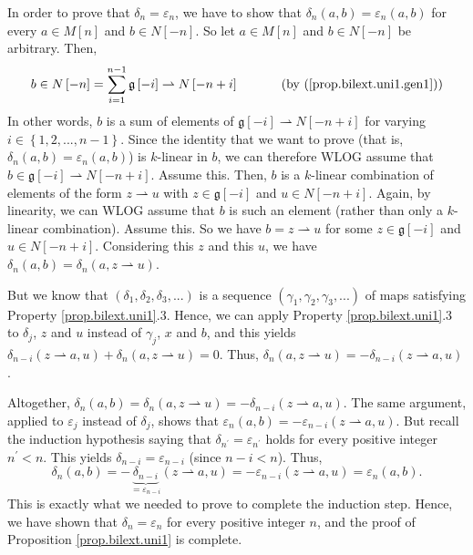 \documentclass[etingof-lie.tex]{subfiles}
\begin{document}
\begin{noncompile}
\begin{vershort}
In order to prove that $\delta_{n}=\varepsilon_{n}$, we have to show that
$\delta_{n}\left(  a,b\right)  =\varepsilon_{n}\left(  a,b\right)  $ for every
$a\in M\left[  n\right]  $ and $b\in N\left[  -n\right]  $. So let $a\in
M\left[  n\right]  $ and $b\in N\left[  -n\right]  $ be arbitrary. Then,%
\[
b\in N\left[  -n\right]  =\sum\limits_{i=1}^{n-1}\mathfrak{g}\left[
-i\right]  \rightharpoonup N\left[  -n+i\right]  \ \ \ \ \ \ \ \ \ \ \left(
\text{by (\ref{prop.bilext.uni1.gen1})}\right)
\]
In other words, $b$ is a sum of elements of $\mathfrak{g}\left[  -i\right]
\rightharpoonup N\left[  -n+i\right]  $ for varying $i\in\left\{
1,2,...,n-1\right\}  $. Since the identity that we want to prove (that is,
$\delta_{n}\left(  a,b\right)  =\varepsilon_{n}\left(  a,b\right)  $) is
$k$-linear in $b$, we can therefore WLOG assume that $b\in\mathfrak{g}\left[
-i\right]  \rightharpoonup N\left[  -n+i\right]  $. Assume this. Then, $b$ is
a $k$-linear combination of elements of the form $z\rightharpoonup u$ with
$z\in\mathfrak{g}\left[  -i\right]  $ and $u\in N\left[  -n+i\right]  $.
Again, by linearity, we can WLOG assume that $b$ is such an element (rather
than only a $k$-linear combination). Assume this. So we have
$b=z\rightharpoonup u$ for some $z\in\mathfrak{g}\left[  -i\right]  $ and
$u\in N\left[  -n+i\right]  $. Considering this $z$ and this $u$, we have
$\delta_{n}\left(  a,b\right)  =\delta_{n}\left(  a,z\rightharpoonup u\right)
$.

But we know that $\left(  \delta_{1},\delta_{2},\delta_{3},...\right)  $ is a
sequence $\left(  \gamma_{1},\gamma_{2},\gamma_{3},...\right)  $ of maps
satisfying Property \ref{prop.bilext.uni1}.3. Hence, we can apply Property
\ref{prop.bilext.uni1}.3 to $\delta_{j}$, $z$ and $u$ instead of $\gamma_{j}$,
$x$ and $b$, and this yields $\delta_{n-i}\left(  z\rightharpoonup a,u\right)
+\delta_{n}\left(  a,z\rightharpoonup u\right)  =0$. Thus, $\delta_{n}\left(
a,z\rightharpoonup u\right)  =-\delta_{n-i}\left(  z\rightharpoonup
a,u\right)  $.

Altogether, $\delta_{n}\left(  a,b\right)  =\delta_{n}\left(
a,z\rightharpoonup u\right)  =-\delta_{n-i}\left(  z\rightharpoonup
a,u\right)  $. The same argument, applied to $\varepsilon_{j}$ instead of
$\delta_{j}$, shows that $\varepsilon_{n}\left(  a,b\right)  =-\varepsilon
_{n-i}\left(  z\rightharpoonup a,u\right)  $. But recall the induction
hypothesis saying that $\delta_{n^{\prime}}=\varepsilon_{n^{\prime}}$ holds
for every positive integer $n^{\prime}<n$. This yields $\delta_{n-i}%
=\varepsilon_{n-i}$ (since $n-i<n$). Thus,%
\[
\delta_{n}\left(  a,b\right)  =-\underbrace{\delta_{n-i}}_{=\varepsilon_{n-i}%
}\left(  z\rightharpoonup a,u\right)  =-\varepsilon_{n-i}\left(
z\rightharpoonup a,u\right)  =\varepsilon_{n}\left(  a,b\right)  .
\]
This is exactly what we needed to prove to complete the induction step. Hence,
we have shown that $\delta_{n}=\varepsilon_{n}$ for every positive integer
$n$, and the proof of Proposition \ref{prop.bilext.uni1} is complete.
\end{vershort}


\end{noncompile}
\end{document}
